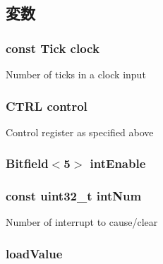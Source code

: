 \subsection{変数}
\hypertarget{classSp804_1_1Timer_a9461588ed360796ba2408cc9e90e0ab8}{
\subsubsection[{clock}]{\setlength{\rightskip}{0pt plus 5cm}const {\bf Tick} {\bf clock}}}
\label{classSp804_1_1Timer_a9461588ed360796ba2408cc9e90e0ab8}
Number of ticks in a clock input \hypertarget{classSp804_1_1Timer_a8e8d336fe93a134873147e3282e103fb}{
\subsubsection[{control}]{\setlength{\rightskip}{0pt plus 5cm}CTRL {\bf control}}}
\label{classSp804_1_1Timer_a8e8d336fe93a134873147e3282e103fb}
Control register as specified above \hypertarget{classSp804_1_1Timer_aa5de02b5e99e1f995e2f01bf8336e224}{
\subsubsection[{intEnable}]{\setlength{\rightskip}{0pt plus 5cm}Bitfield$<$5$>$ {\bf intEnable}}}
\label{classSp804_1_1Timer_aa5de02b5e99e1f995e2f01bf8336e224}
\hypertarget{classSp804_1_1Timer_a4685f3f9289d179d8e500f7ad5ad20ed}{
\subsubsection[{intNum}]{\setlength{\rightskip}{0pt plus 5cm}const {\bf uint32\_\-t} {\bf intNum}}}
\label{classSp804_1_1Timer_a4685f3f9289d179d8e500f7ad5ad20ed}
Number of interrupt to cause/clear \hypertarget{classSp804_1_1Timer_a21dfc3b5f848baeba0be506b5b289485}{
\subsubsection[{loadValue}]{ {\bf loadValue}}}
